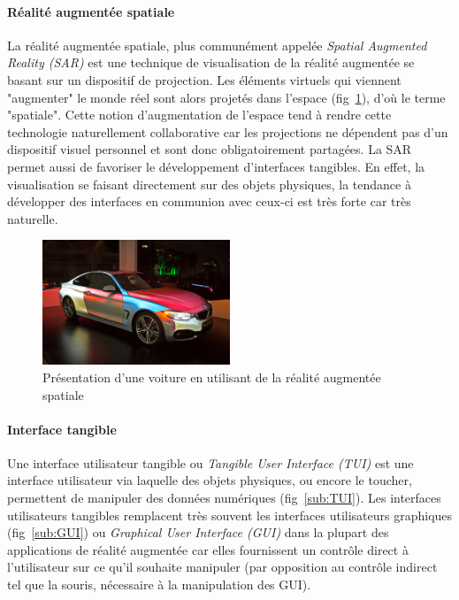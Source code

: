 \paragraph{Réalité augmentée spatiale}
La réalité augmentée spatiale, plus communément appelée \emph{Spatial Augmented Reality (SAR)} est une technique de visualisation de la réalité augmentée se basant sur un dispositif de projection. Les éléments virtuels qui viennent "augmenter" le monde réel sont alors projetés dans l'espace (fig~\ref{fig:SAR}), d'où le terme "spatiale". Cette notion d'augmentation de l'espace tend à rendre cette technologie naturellement collaborative car les projections ne dépendent pas d'un dispositif visuel personnel et sont donc obligatoirement partagées. La SAR permet aussi de favoriser le développement d'interfaces tangibles. En effet, la visualisation se faisant directement sur des objets physiques, la tendance à développer des interfaces en communion avec ceux-ci est très forte car très naturelle.

\begin{figure}[H]
\centering
\includegraphics[width=0.5\textwidth]{images/SARMappingCar2}
\caption{Présentation d'une voiture en utilisant de la réalité augmentée spatiale\protect\footnotemark}
\label{fig:SAR}
\end{figure}

\paragraph{Interface tangible}
Une interface utilisateur tangible ou \emph{Tangible User Interface (TUI)} est une interface utilisateur via laquelle des objets physiques, ou encore le toucher, permettent de manipuler des données numériques (fig~\ref{sub:TUI}). Les interfaces utilisateurs tangibles remplacent très souvent les interfaces utilisateurs graphiques (fig~\ref{sub:GUI}) ou \emph{Graphical User Interface (GUI)} dans la plupart des applications de réalité augmentée car elles fournissent un contrôle direct à l'utilisateur sur ce qu'il souhaite manipuler (par opposition au contrôle indirect tel que la souris, nécessaire à la manipulation des GUI).

